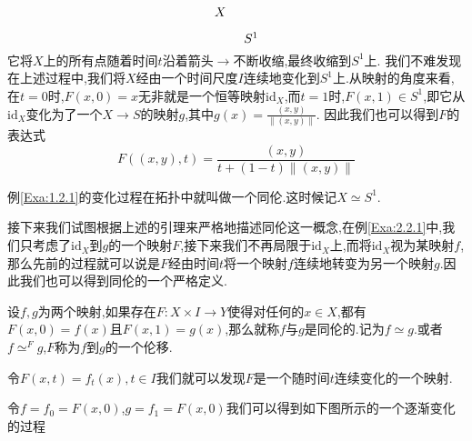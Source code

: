 \documentclass{article}
\begin{document}
\begin{example}
\[\begin{tikzpicture}[x=0.75pt,y=0.75pt,yscale=-1,xscale=1]
\draw (294,73.4) node [anchor=north west][inner sep=0.75pt]    {$X$};
\draw (325,99.4) node [anchor=north west][inner sep=0.75pt]    {$S^{1}$};
\end{tikzpicture}\]
它将$X$上的所有点随着时间$t$沿着箭头$\to$不断收缩,最终收缩到$S^1$上.
我们不难发现在上述过程中,我们将$X$经由一个时间尺度$I$连续地变化到$S^1$上.从映射的角度来看,在$t = 0$时,$F(x,0) = x$无非就是一个恒等映射$\text{id}_X$,而$t = 1$时,$F(x,1) \in S^1$,即它从$\text{id}_X$变化为了一个$X \to S$的映射$g$,其中$g(x) = \frac{(x,y)}{\|(x,y)\|}$.
因此我们也可以得到$F$的表达式
$$
F((x,y),t) = \frac{(x,y)}{t+(1-t) \|(x,y)\|}
$$
\label{Exa:1.2.1}
\end{example}
例\ref{Exa:1.2.1}的变化过程在拓扑中就叫做一个同伦.这时候记$X \simeq S^1$.


接下来我们试图根据上述的引理来严格地描述同伦这一概念,在例\ref{Exa:2.2.1}中,我们只考虑了$\text{id}_X$到$g$的一个映射$F$,接下来我们不再局限于$\text{id}_X$上,而将$\text{id}_X$视为某映射$f$,那么先前的过程就可以说是$F$经由时间$t$将一个映射$f$连续地转变为另一个映射$g$.因此我们也可以得到同伦的一个严格定义.

\begin{definition}
    设$f,g$为两个映射,如果存在$F : X \times I \to Y$使得对任何的$x \in X$,都有$F(x,0) = f(x)$且$F(x,1) = g(x)$,那么就称$f$与$g$是同伦的.记为$f \simeq g$.或者$f \simeq^{F} g$,$F$称为$f$到$g$的一个伦移.
    \label{Def:1.2.1}
\end{definition}

令$F(x,t) = f_t(x),t \in I$我们就可以发现$F$是一个随时间$t$连续变化的一个映射.

令$f = f_0 = F(x,0)$,$g = f_1 = F(x,0)$我们可以得到如下图所示的一个逐渐变化的过程
\end{document}
